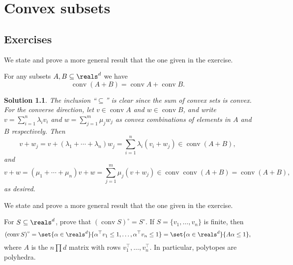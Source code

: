 \documentclass[article, a4paper, 11pt, oneside]{memoir}
\numberwithin{equation}{chapter}
\theoremstyle{nonumberplain}
\newtheorem{solution}{Solution}
\begin{document}
\chapter{Convex subsets}

\section*{Exercises}

\newcommand{\conv}{\operatorname{conv}}
\newcommand{\polar}[1]{{#1}^{\circ}}
\newcommand{\trans}{^{\top}}

\begin{exerciseframed*}[7]
    We state and prove a more general result that the one given in the exercise.

    For any subsets $A,B \subseteq \reals^d$ we have
    \begin{equation*}
        \conv (A + B)
            = \conv A + \conv B.
    \end{equation*}
\end{exerciseframed*}

\begin{solution}
    The inclusion \enquote{$\subseteq$} is clear since the sum of convex sets is convex. For the converse direction, let $v \in \conv A$ and $w \in \conv B$, and write $v = \sum_{i=1}^n \lambda_i v_i$ and $w = \sum_{j=1}^m \mu_j w_j$ as convex combinations of elements in $A$ and $B$ respectively. Then
    \begin{equation*}
        v + w_j
            = v + (\lambda_1 + \cdots + \lambda_n)w_j
            = \sum_{i=1}^n \lambda_i (v_i + w_j)
            \in \conv(A + B),
    \end{equation*}
    and
    \begin{equation*}
        v + w
            = (\mu_1 + \cdots + \mu_n)v + w
            = \sum_{j=1}^m \mu_j (v + w_j)
            \in \conv\conv(A + B)
            = \conv(A + B),
    \end{equation*}
    as desired.
\end{solution}


\begin{exerciseframed*}[9]
    We state and prove a more general result that the one given in the exercise.

    For $S \subseteq \reals^d$, prove that $\polar{(\conv S)} = \polar{S}$. If $S = \{v_1, \ldots, v_n\}$ is finite, then
    \begin{equation*}
        \polar{(\conv S)}
            = \set{\alpha \in \reals^d}{\alpha\trans v_1 \leq 1, \ldots, \alpha\trans v_n \leq 1}
            = \set{\alpha \in \reals^d}{A\alpha \leq 1},
    \end{equation*}
    where $A$ is the $n \prod d$ matrix with rows $v_1\trans, \ldots, v_n\trans$. In particular, polytopes are polyhedra.
\end{exerciseframed*}
\end{document}
